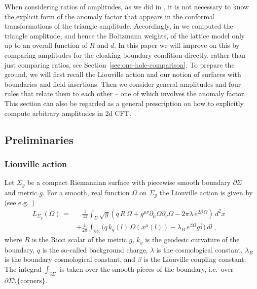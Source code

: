 \documentclass[11pt,a4paper]{article}
\numberwithin{equation}{section}
\begin{document}
When considering ratios of amplitudes, as we did in \cite{Brehm:2021wev}, it is not necessary to know the explicit form of the anomaly factor that appears in the conformal transformations of the triangle amplitude. 
Accordingly, in \cite{Brehm:2021wev} we computed the triangle amplitude, and hence the Boltzmann weights, of the lattice model only up to an overall function of $R$ and $d$.
In this paper we will improve on this by comparing amplitudes for the cloaking boundary condition directly, rather than just comparing ratios, see Section~\ref{sec:one-hole-comparison}. To prepare the ground, we will first recall the Liouville action and our notion of surfaces with boundaries and field insertions. Then we consider general amplitudes and four rules that relate them to each other -- one of which involves the anomaly factor. This section can also be regarded as a general prescription on how to explicitly compute arbitrary amplitudes in 2d CFT.  

\subsection{Preliminaries}

\subsubsection{Liouville action} 

Let $\Sigma_{g}$ be a compact Riemannian surface with piecewise smooth boundary $\partial\Sigma$ and  metric $g$. For a smooth, real function $\Omega$ on $\Sigma_g$ the Liouville action is given by 
(see e.g.~\cite{Fateev:2000ik,Teschner:2000md,Bautista:2021ogd,Zamolodchikov:2007})
%
\begin{equation}
\begin{split}
    L_{\Sigma_g}(\Omega) \,= &~~~\,\frac{1}{4\pi} \int_\Sigma \sqrt{g} \left( q \,R\, \Omega + g^{\mu\nu}\partial_\mu\Omega \partial_\nu \Omega  - 2\pi\lambda\, e^{2\beta \,\Omega}\right)\,d^2x\\
    &+ \frac{1}{2\pi} \int_{\partial\Sigma} 
\Big(
    q \,k_g(l)\, \Omega\!\left(x^\mu(l)\right) - \lambda_B \,  e^{\beta\Omega} g^{\frac{1}{4}}
\Big)    
    \, dl \ ,
\end{split}
\end{equation}
%
where $R$ is the Ricci scalar of the metric $g$, $k_g$ is the geodesic curvature of the boundary, $q$ is the so-called background charge, $\lambda$ is the cosmological constant, $\lambda_B$ is the boundary cosmological constant, and $\beta$ is the Liouville coupling constant. 
The integral $\int_{\partial\Sigma}$ is taken over the smooth pieces of the boundary, i.e.\ over $\partial\Sigma \setminus \{ \text{corners} \}$.
\end{document}
